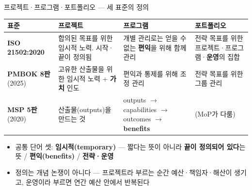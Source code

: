\begin{frame}[allowframebreaks=1.0]{프로젝트·프로그램·포트폴리오 — 세 표준의 정의}
\small
{\footnotesize\setlength{\tabcolsep}{3pt}\renewcommand{\arraystretch}{1.12}
\begin{tabular}{@{}>{\raggedright\arraybackslash}p{}>{\raggedright\arraybackslash}p{}>{\raggedright\arraybackslash}p{}>{\raggedright\arraybackslash}p{}@{}}
\toprule
\textbf{표준} & \textbf{프로젝트} & \textbf{프로그램} & \textbf{포트폴리오} \\
\midrule
\textbf{ISO 21502:2020} & 합의된 목표를 위한 임시적 노력. 시작·끝이 정의됨 & 개별 관리로는 얻을 수 없는 \textbf{편익}을 위해 함께 관리 & 전략 목표를 위한 프로젝트·프로그램·\textbf{운영}의 집합 \\
\textbf{PMBOK 8판} (2025) & 고유한 산출물을 위한 임시적 노력 + \textbf{가치} 인도 & 편익과 통제를 위해 조정 관리 & 전략 목표를 위한 그룹 관리 \\
\textbf{MSP 5판} (2020) & 산출물(outputs)을 만드는 것 & outputs $\rightarrow$ capabilities $\rightarrow$ outcomes $\rightarrow$ \textbf{benefits} & (MoP가 다룸) \\
\bottomrule
\end{tabular}}
\par\smallskip
\begin{itemize}
\item\relax 공통 단어 셋: \textbf{임시적(temporary)} — 짧다는 뜻이 아니라 \textbf{끝이 정의되어 있다}는 뜻 / \textbf{편익(benefits)} / \textbf{전략·운영}
\item\relax 정의는 개념 논쟁이 아니다 — 프로젝트라 부르는 순간 예산·책임자·해산이 생기고, 운영이라 부르면 연간 예산 안에서 반복된다
\end{itemize}
\end{frame}

